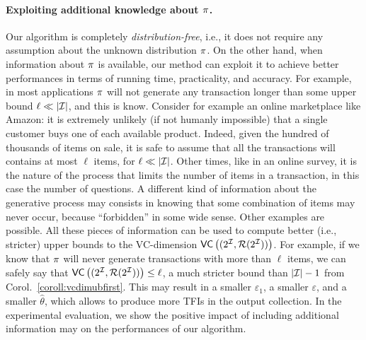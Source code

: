 \paragraph{Exploiting additional knowledge about $\pi$.} 
Our algorithm is completely \emph{distribution-free}, i.e., it does not require
any assumption about the unknown distribution $\pi$. On the other hand, when
information about $\pi$ is available, our method can exploit it to achieve
better performances in terms of running time, practicality, and accuracy. 
For example, in most applications $\pi$ will not generate any transaction
longer than some upper bound $\ell\ll|{\cal I}|$, and this is know. 
Consider for example an online
marketplace like Amazon: it is extremely unlikely (if not humanly impossible)
that a single customer buys one of each available product. Indeed, given the
hundred of thousands of items on sale, it is safe to assume that all the
transactions will contains at most $\ell$ items, for $\ell\ll|{\cal I}|$. Other
times, like in an online survey, it is the nature of the process that limits the
number of items in a transaction, in this case the number of questions. A
different kind of information about the generative process may consists in
knowing that some combination of items may never occur, because ``forbidden'' in
some wide sense. Other examples are possible. All these pieces of information
can be used to compute better (i.e., stricter) upper bounds to the VC-dimension
$\mathsf{VC}\left((2^{\cal I},\mathcal{R}(2^{\cal I}))\right)$. For example, if we know that $\pi$ will never generate
transactions with more than $\ell$ items, we can safely say that
$\mathsf{VC}\left((2^{\cal I},\mathcal{R}(2^{\cal I}))\right)\le \ell$, a much stricter bound than $|{\cal I}|-1$ from
Corol.~\ref{coroll:vcdimubfirst}. This may result in a smaller $\varepsilon_1$, a smaller 
$\varepsilon$, and a smaller $\hat\theta$, which allows to produce
more TFIs in the output collection. In the experimental evaluation, we show the
positive impact of including additional information may on the performances of
our algorithm.
\fi
